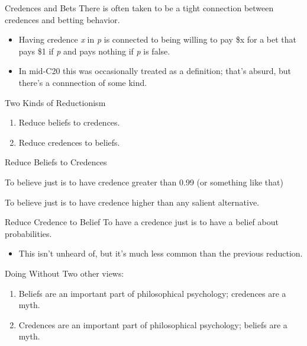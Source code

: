 \documentclass[
  17pt,
  letterpaper,
  ignorenonframetext,
  aspectratio=169,
  handout]{beamer}
\providecommand{\tightlist}{%
  \setlength{\itemsep}{0pt}\setlength{\parskip}{0pt}}\usepackage{longtable,booktabs,array}
\begin{document}
\begin{frame}{Credences and Bets}
\protect\hypertarget{credences-and-bets}{}
There is often taken to be a tight connection between credences and
betting behavior.

\begin{itemize}[<+->]
\tightlist
\item
  Having credence \emph{x} in \emph{p} is connected to being willing to
  pay \$x for a bet that pays \$1 if \emph{p} and pays nothing if
  \emph{p} is false.
\item
  In mid-C20 this was occasionally treated as a definition; that's
  absurd, but there's a connnection of some kind.
\end{itemize}
\end{frame}

\begin{frame}{Two Kinds of Reductionism}
\protect\hypertarget{two-kinds-of-reductionism}{}
\begin{enumerate}[<+->]
\tightlist
\item
  Reduce beliefs to credences.
\item
  Reduce credences to beliefs.
\end{enumerate}
\end{frame}

\begin{frame}{Reduce Beliefs to Credences}
\protect\hypertarget{reduce-beliefs-to-credences}{}
\begin{description}[<+->]
\tightlist
\item[Simple reduction]
To believe just is to have credence greater than 0.99 (or something like
that)
\item[Complicated reduction]
To believe just is to have credence higher than any salient alternative.
\end{description}
\end{frame}

\begin{frame}{Reduce Credence to Belief}
\protect\hypertarget{reduce-credence-to-belief}{}
To have a credence just is to have a belief about probabilities.

\begin{itemize}[<+->]
\tightlist
\item
  This isn't unheard of, but it's much less common than the previous
  reduction.
\end{itemize}
\end{frame}

\begin{frame}{Doing Without}
\protect\hypertarget{doing-without}{}
Two other views:

\begin{enumerate}[<+->]
\tightlist
\item
  Beliefs are an important part of philosophical psychology; credences
  are a myth.
\item
  Credences are an important part of philosophical psychology; beliefs
  are a myth.
\end{enumerate}
\end{frame}
\end{document}
